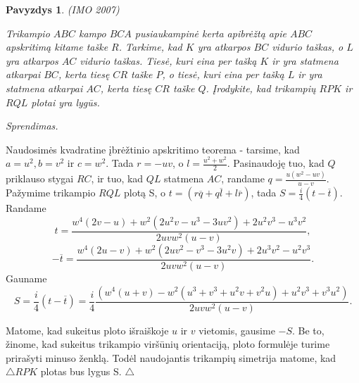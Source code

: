 \documentclass[11pt,a4paper,twoside]{book}
\newenvironment{sprendimas}{\noindent \textit{Sprendimas.}}{\hfill $\triangle$}
\newcounter{foo}[subsection]
\newtheorem{pavnr}[foo]{Pavyzdys}
\theoremstyle{definition} \newtheorem*{api}{Apibrėžimas}
\theoremstyle{remark} \newtheorem*{pastaba}{Pastaba}
\begin{document}
\begin{pavnr}
(IMO 2007)

Trikampio $ABC$ kampo $BCA$ pusiaukampinė kerta apibrėžtą apie $ABC$ apskritimą kitame taške $R$. Tarkime, kad $K$ yra atkarpos $BC$ vidurio taškas, o $L$ yra atkarpos $AC$ vidurio taškas. Tiesė, kuri eina per tašką $K$ ir yra statmena atkarpai $BC$, kerta tiesę $CR$ taške $P$, o tiesė, kuri eina per tašką $L$ ir yra statmena atkarpai $AC$, kerta tiesę $CR$ taške $Q$. Įrodykite, kad trikampių $RPK$ ir $RQL$ plotai yra lygūs.
\end{pavnr}
\begin{sprendimas}

Naudosimės kvadratine įbrėžtinio apskritimo teorema - tarsime, kad $a=u^2, b=v^2$ ir $c=w^2$. Tada $r=-uv$, o $l=\frac{u^2+w^2}{2}$. Pasinaudoję tuo, kad $Q$ priklauso stygai $RC$, ir tuo, kad $QL$ statmena $AC$, randame $q=\frac{u(w^2 - uv)}{u-v}$. Pažymime trikampio $RQL$ plotą S, o $t=(r\overline{q} +q\overline{l}+l\overline{r})$, tada $S=\frac{i}{4}(t-\overline{t})$. 
Randame
$$t=\frac{w^4(2v-u) +w^2(2u^2v-u^3-3uv^2) +2u^2v^3 - u^3v^2}{2uvw^2(u-v)},$$
$$-\overline{t}=\frac{w^4(2u-v) +w^2(2uv^2-v^3-3u^2v) +2u^3v^2 - u^2v^3}{2uvw^2(u-v)}.$$
Gauname
$$S=\frac{i}{4}(t-\overline{t})=\frac{i}{4}\frac{(w^4(u+v)-w^2(u^3+v^3+u^2v+v^2u)+u^2v^3+v^3u^2)}{2uvw^2(u-v)}.$$

Matome, kad sukeitus ploto išraiškoje $u$ ir $v$ vietomis, gausime $-S$. Be to, žinome, kad sukeitus trikampio viršūnių orientaciją, ploto formulėje turime prirašyti minuso ženklą. Todėl naudojantis trikampių simetrija matome, kad $\triangle RPK$ plotas bus lygus S.
\end{sprendimas}
\end{document}

